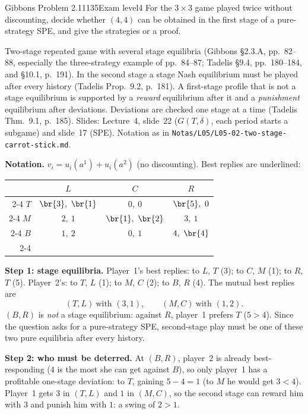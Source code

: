 \begin{exsol}{Gibbons Problem 2.11}{135}{Exam level}{4}
\asked For the $3\times3$ game played twice without discounting, decide whether $(4,4)$ can be
obtained in the first stage of a pure-strategy SPE, and give the strategies or a proof.

\method Two-stage repeated game with several stage equilibria (Gibbons \S2.3.A, pp.~82--88,
especially the three-strategy example of pp.~84--87; Tadelis \S9.4, pp.~180--184, and \S10.1,
p.~191). In the second stage a stage Nash equilibrium must be played after every history (Tadelis
Prop.~9.2, p.~181). A first-stage profile that is not a stage equilibrium is supported by a
\emph{reward} equilibrium after it and a \emph{punishment} equilibrium after deviations. Deviations
are checked one stage at a time (Tadelis Thm.~9.1, p.~185). Slides: Lecture~4, slide~22
($G(T,\delta)$, each period starts a subgame) and slide~17 (SPE). Notation as in
\texttt{Notas/L05/L05-02-two-stage-carrot-stick.md}.

\solution
\textbf{Notation.} $v_i = u_i(a^1) + u_i(a^2)$ (no discounting). Best replies are underlined:
\begin{center}
\begin{tabular}{r|c|c|c|}
\multicolumn{1}{r}{} & \multicolumn{1}{c}{$L$} & \multicolumn{1}{c}{$C$} & \multicolumn{1}{c}{$R$}\\ \cline{2-4}
$T$ & $\br{3},\ \br{1}$ & $0,\ 0$ & $\br{5},\ 0$ \\ \cline{2-4}
$M$ & $2,\ 1$ & $\br{1},\ \br{2}$ & $3,\ 1$ \\ \cline{2-4}
$B$ & $1,\ 2$ & $0,\ 1$ & $4,\ \br{4}$ \\ \cline{2-4}
\end{tabular}
\end{center}

\textbf{Step 1: stage equilibria.} Player~1's best replies: to $L$, $T$ (3); to $C$, $M$ (1); to $R$,
$T$ (5). Player~2's: to $T$, $L$ (1); to $M$, $C$ (2); to $B$, $R$ (4). The mutual best replies are
\[
  (T,L)\ \text{with } (3,1), \qquad (M,C)\ \text{with } (1,2).
\]
$(B,R)$ is \emph{not} a stage equilibrium: against $R$, player~1 prefers $T$ ($5 > 4$). Since the
question asks for a pure-strategy SPE, second-stage play must be one of these two pure equilibria
after every history.

\textbf{Step 2: who must be deterred.} At $(B,R)$, player~2 is already best-responding ($4$ is the
most she can get against $B$), so only player~1 has a profitable one-stage deviation: to $T$, gaining
$5 - 4 = 1$ (to $M$ he would get $3 < 4$). Player~1 gets $3$ in $(T,L)$ and $1$ in $(M,C)$, so the
second stage can reward him with $3$ and punish him with $1$: a swing of $2 > 1$.


\end{exsol}
